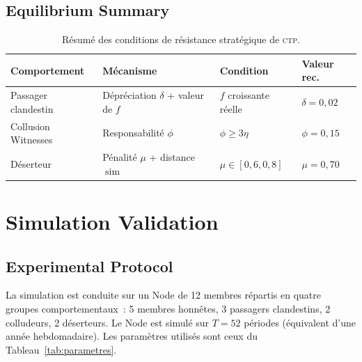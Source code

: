 \documentclass[12pt,a4paper]{article}
\theoremstyle{definition}
\theoremstyle{plain}
\theoremstyle{remark}
\newcommand{\CTP}{\textsc{ctp}}
\newcommand{\1}{\mathbf{1}}
\begin{document}
\subsection{Equilibrium Summary}

\begin{table}[h]
\centering
\caption{Résumé des conditions de résistance stratégique de \CTP{}.}
\label{tab:equilibres}
\begin{tabular}{llll}
\toprule
\textbf{Comportement} & \textbf{Mécanisme} & \textbf{Condition} & \textbf{Valeur rec.} \\
\midrule
Passager clandestin & Dépréciation $\delta$ + valeur de $f$ & $f$ croissante réelle & $\delta = 0{,}02$ \\
Collusion Witnesses & Responsabilité $\phi$ & $\phi \geq 3\eta$ & $\phi = 0{,}15$ \\
Déserteur & Pénalité $\mu$ + distance $\operatorname{sim}$ & $\mu \in [0{,}6, 0{,}8]$ & $\mu = 0{,}70$ \\
\bottomrule
\end{tabular}
\end{table}

\section{Simulation Validation}
\label{sec:simulation}

\subsection{Experimental Protocol}

La simulation est conduite sur un Node de 12 membres répartis en quatre
groupes comportementaux~: 5 membres honnêtes, 3 passagers clandestins, 2
colludeurs, 2 déserteurs. Le Node est simulé sur $T = 52$ périodes
(équivalent d'une année hebdomadaire). Les paramètres utilisés sont ceux du
Tableau~\ref{tab:parametres}.
\end{document}
